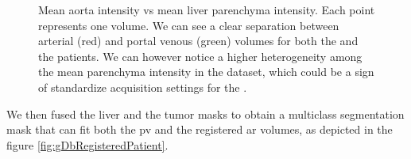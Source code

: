 {\begin{figure}[!ht]
\begin{mdframed}[backgroundcolor=blue!50,linecolor=blue!50]
		\caption{Mean aorta intensity vs mean liver parenchyma intensity. Each point represents one volume. We can see a clear separation between arterial (red) and portal venous (green) volumes for both the \textbf{} and the \textbf{} patients. We can however notice a higher heterogeneity among the mean parenchyma intensity in the \textbf{} dataset, which could be a sign of standardize acquisition settings for the \textbf{}.
		}
		\label{fig:gdbAortaPlot}
	\end{mdframed}
\end{figure}
}
We then fused the liver and the tumor masks to obtain a multiclass
segmentation mask that can fit both the \ac{pv} and the registered \ac{ar} volumes, as depicted in the figure \ref{fig:gDbRegisteredPatient}.

